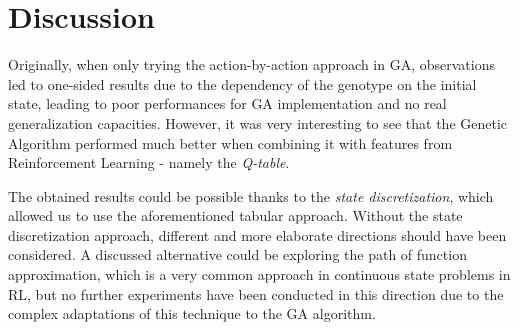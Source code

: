 \section{Discussion}
Originally, when only trying the action-by-action approach in GA, observations led to one-sided results due to the dependency of the genotype on the initial state, leading to poor performances for GA implementation and no real generalization capacities.
However, it was very interesting to see that the Genetic Algorithm performed much better when combining it with features from Reinforcement Learning - namely the \textit{Q-table}.

The obtained results could be possible thanks to the \textit{state discretization}, which allowed us to use the aforementioned tabular approach.
Without the state discretization approach, different and more elaborate directions should have been considered. 
A discussed alternative could be exploring the path of function approximation, which is a very common approach in continuous state problems in RL, 
but no further experiments have been conducted in this direction due to the complex adaptations of this technique to the GA algorithm.
